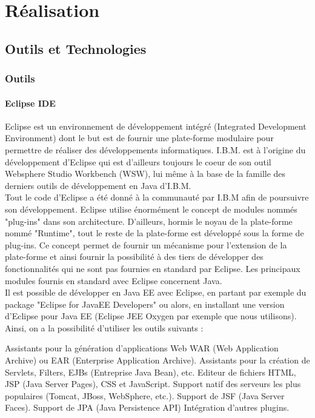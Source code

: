 \chapter{Réalisation}
\minitoc %
\clearpage
\section{Outils et Technologies}
\subsection{Outils}
\subsubsection{Eclipse IDE}
Eclipse est un environnement de développement intégré (Integrated Development Environment) dont le but est de fournir une plate-forme modulaire pour permettre de réaliser des développements informatiques. I.B.M. est à l'origine du développement d'Eclipse qui est d'ailleurs toujours le coeur de son outil Websphere Studio Workbench (WSW), lui même à la base de la famille des derniers outils de développement en Java d'I.B.M.\cite{eclipse} \\ 
Tout le code d'Eclipse a été donné à la communauté par I.B.M afin de poursuivre son développement. Eclipse utilise énormément le concept de modules nommés "plug-ins" dans son architecture. D'ailleurs, hormis le noyau de la plate-forme nommé "Runtime", tout le reste de la plate-forme est développé sous la forme de plug-ins. Ce concept permet de fournir un mécanisme pour l'extension de la plate-forme et ainsi fournir la possibilité à des tiers de développer des fonctionnalités qui ne sont pas fournies en standard par Eclipse. Les principaux modules fournis en standard avec Eclipse concernent Java.\\
Il est possible de développer en Java EE avec Eclipse, en partant par exemple du package "Eclipse for JavaEE Developers" ou alors, en installant une version d'Eclipse pour Java EE (Eclipse JEE Oxygen par exemple que nous utilisons). Ainsi, on a la possibilité d'utiliser les outils suivants :      
\begin{itemize}
	\itemcheck Assistants pour la génération d'applications Web WAR (Web Application Archive) ou EAR (Enterprise Application Archive).
	\itemcheck Assistants pour la création de Servlets, Filters, EJBs (Entreprise Java Bean), etc.
	\itemcheck Editeur de fichiers HTML, JSP (Java Server Pages), CSS et JavaScript.
	\itemcheck Support natif des serveurs les plus populaires (Tomcat, JBoss, WebSphere, etc.).
	\itemcheck Support de JSF (Java Server Faces). 
	\itemcheck Support de JPA (Java Persistence API) 
	\itemcheck Intégration d'autres plugins.
\end{itemize}
